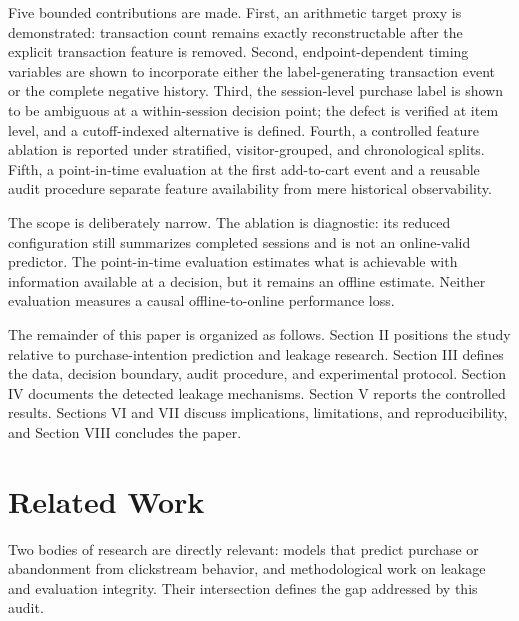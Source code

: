 \documentclass[conference, letterpaper]{IEEEtran}
\begin{document}
Five bounded contributions are made. First, an arithmetic target proxy is demonstrated: transaction count remains exactly reconstructable after the explicit transaction feature is removed. Second, endpoint-dependent timing variables are shown to incorporate either the label-generating transaction event or the complete negative history. Third, the session-level purchase label is shown to be ambiguous at a within-session decision point; the defect is verified at item level, and a cutoff-indexed alternative is defined. Fourth, a controlled feature ablation is reported under stratified, visitor-grouped, and chronological splits. Fifth, a point-in-time evaluation at the first add-to-cart event and a reusable audit procedure separate feature availability from mere historical observability.

The scope is deliberately narrow. The ablation is diagnostic: its reduced configuration still summarizes completed sessions and is not an online-valid predictor. The point-in-time evaluation estimates what is achievable with information available at a decision, but it remains an offline estimate. Neither evaluation measures a causal offline-to-online performance loss.

The remainder of this paper is organized as follows. Section II positions the study relative to purchase-intention prediction and leakage research. Section III defines the data, decision boundary, audit procedure, and experimental protocol. Section IV documents the detected leakage mechanisms. Section V reports the controlled results. Sections VI and VII discuss implications, limitations, and reproducibility, and Section VIII concludes the paper.

\section{Related Work}
Two bodies of research are directly relevant: models that predict purchase or abandonment from clickstream behavior, and methodological work on leakage and evaluation integrity. Their intersection defines the gap addressed by this audit.
\end{document}
